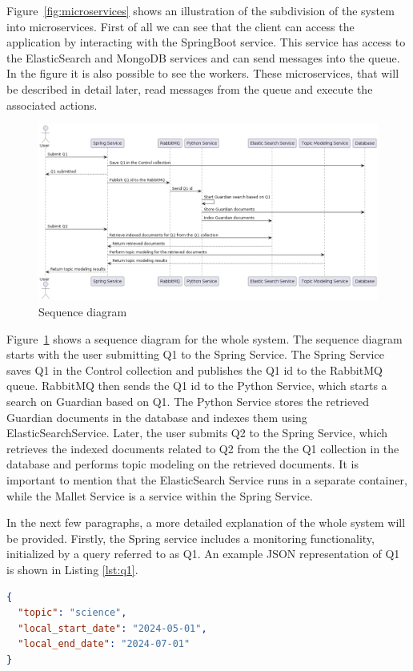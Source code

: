 Figure~\ref{fig:microservices} shows an illustration of the subdivision of
the system into microservices. First of all we can see that the client can
access the application by interacting with the SpringBoot service.
This service has access to the ElasticSearch and MongoDB services and can
send messages into the queue. In the figure it is also possible to see
the workers. These microservices, that will be described in detail
later, read messages from the queue and execute the associated actions.

\clearpage

\begin{figure}[ht]
    \centering
    \includegraphics[width=0.7\linewidth]{figures/sequenceDiagram.png}
    \caption{Sequence diagram}
    \label{fig:seqDiagram}
\end{figure}

Figure~\ref{fig:seqDiagram} shows a sequence diagram for the whole system.
The sequence diagram starts with the user submitting Q1 to the Spring Service. The
Spring Service saves Q1 in the Control collection and publishes the Q1 id to the
RabbitMQ queue. RabbitMQ then sends the Q1 id to the Python Service, which starts a
search on Guardian based on Q1. The Python Service stores the retrieved Guardian
documents in the database and indexes them using ElasticSearchService. Later, the user
submits Q2 to the Spring Service, which retrieves the indexed documents related to Q2
from the the Q1 collection in the database and performs topic modeling on the retrieved
documents. It is important to mention that the ElasticSearch Service runs in a separate
container, while the Mallet Service is a service within the Spring Service.

In the next few paragraphs, a more detailed explanation of the whole system will be provided.
Firstly, the Spring service includes a monitoring functionality, initialized by a query referred to as Q1. An
example JSON representation of Q1 is shown in Listing \ref{lst:q1}.

\begin{lstlisting}[language=json, caption={JSON representation of Q1}, label={lst:q1}]
{
  "topic": "science",
  "local_start_date": "2024-05-01",
  "local_end_date": "2024-07-01"
}
\end{lstlisting}

